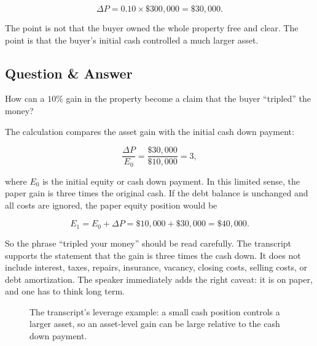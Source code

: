 \begin{equation}
\Delta P = 0.10 \times \$300{,}000 = \$30{,}000.
\end{equation}

The point is not that the buyer owned the whole property free and clear. The point is that the buyer's initial cash controlled a much larger asset.

\subsection{Question \& Answer}

How can a \(10\%\) gain in the property become a claim that the buyer ``tripled'' the money?

The calculation compares the asset gain with the initial cash down payment:

\begin{equation}
\frac{\Delta P}{E_0}
=
\frac{\$30{,}000}{\$10{,}000}
=
3,
\end{equation}

where \(E_0\) is the initial equity or cash down payment. In this limited sense, the paper gain is three times the original cash. If the debt balance is unchanged and all costs are ignored, the paper equity position would be

\begin{equation}
E_1 = E_0 + \Delta P = \$10{,}000 + \$30{,}000 = \$40{,}000.
\end{equation}

So the phrase ``tripled your money'' should be read carefully. The transcript supports the statement that the gain is three times the cash down. It does not include interest, taxes, repairs, insurance, vacancy, closing costs, selling costs, or debt amortization. The speaker immediately adds the right caveat: it is on paper, and one has to think long term.

\begin{figure}
\centering
{}
\caption{The transcript's leverage example: a small cash position controls a larger asset, so an asset-level gain can be large relative to the cash down payment.}
\end{figure}

